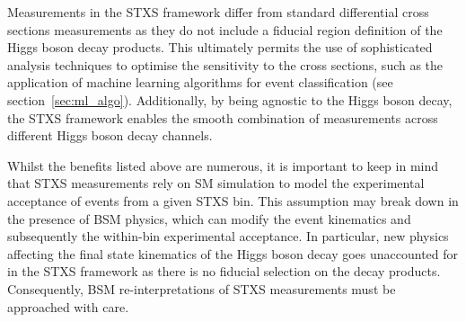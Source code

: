 Measurements in the STXS framework differ from standard differential cross sections measurements as they do not include a fiducial region definition of the Higgs boson decay products. This ultimately permits the use of sophisticated analysis techniques to optimise the sensitivity to the cross sections, such as the application of machine learning algorithms for event classification (see section~\ref{sec:ml_algo}). Additionally, by being agnostic to the Higgs boson decay, the STXS framework enables the smooth combination of measurements across different Higgs boson decay channels. 

Whilst the benefits listed above are numerous, it is important to keep in mind that STXS measurements rely on SM simulation to model the experimental acceptance of events from a given STXS bin. This assumption may break down in the presence of BSM physics, which can modify the event kinematics and subsequently the within-bin experimental acceptance. In particular, new physics affecting the final state kinematics of the Higgs boson decay goes unaccounted for in the STXS framework as there is no fiducial selection on the decay products. Consequently, BSM re-interpretations of STXS measurements must be approached with care.

